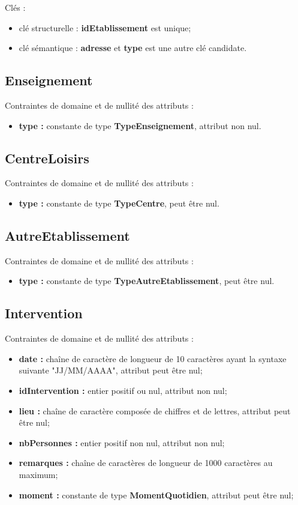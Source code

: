 \documentclass[asi, sansVersion]{picInsa}
\begin{document}
Clés : 
\begin{itemize}
\item clé structurelle : \textbf{idEtablissement} est unique;
\item clé sémantique : \textbf{adresse} et \textbf{type} est une autre clé candidate. \\ 
\end{itemize}

\subsection*{Enseignement}
Contraintes de domaine et de nullité des attributs :
\begin{itemize}
	\item \textbf{type :} constante de type \textbf{TypeEnseignement}, attribut non nul.\\
\end{itemize}

\subsection*{CentreLoisirs}
Contraintes de domaine et de nullité des attributs :
\begin{itemize}
	\item \textbf{type :} constante de type \textbf{TypeCentre}, peut être nul.\\
\end{itemize}

\subsection*{AutreEtablissement}
Contraintes de domaine et de nullité des attributs :
\begin{itemize}
	\item \textbf{type :} constante de type \textbf{TypeAutreEtablissement}, peut être nul.\\
\end{itemize}

\subsection*{Intervention} 
Contraintes de domaine et de nullité des attributs :
\begin{itemize}
	\item \textbf{date :} chaîne de caractère de longueur de 10 caractères ayant la syntaxe suivante "JJ/MM/AAAA", attribut peut être nul;
 	\item \textbf{idIntervention :} entier positif ou nul, attribut non nul;
	\item \textbf{lieu :} chaîne de caractère composée de chiffres et de lettres, attribut peut être nul;
	\item \textbf{nbPersonnes :} entier positif non nul, attribut non nul;  
	\item \textbf{remarques :} chaîne de caractères de longueur de 1000 caractères au maximum;
	\item \textbf{moment :} constante de type \textbf{MomentQuotidien}, attribut peut être nul;\\
\end{itemize}  
\end{document}
